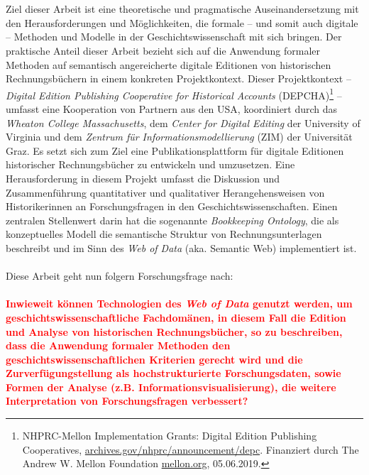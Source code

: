 \documentclass[12pt,a4paper]{article}
\begin{document}
\\
\\
Ziel dieser Arbeit ist eine theoretische und pragmatische Auseinandersetzung mit den Herausforderungen und Möglichkeiten, die formale -- und somit auch digitale -- Methoden und Modelle in der Geschichtswissenschaft mit sich bringen. Der praktische Anteil dieser Arbeit bezieht sich auf die Anwendung formaler Methoden auf semantisch angereicherte digitale Editionen von historischen Rechnungsbüchern in einem konkreten Projektkontext. Dieser Projektkontext -- \textit{Digital Edition Publishing Cooperative for Historical Accounts} (DEPCHA)\footnote{NHPRC-Mellon Implementation Grants: Digital Edition Publishing Cooperatives, \url{archives.gov/nhprc/announcement/depc}. Finanziert durch The Andrew W. Mellon Foundation \url{ mellon.org}, 05.06.2019.} -- umfasst eine Kooperation von Partnern aus den USA, koordiniert durch das \textit{Wheaton College Massachusetts}, dem \textit{Center for Digital Editing} der University of Virginia und dem \textit{Zentrum für Informationsmodellierung} (ZIM) der Universität Graz. Es setzt sich zum Ziel eine Publikationsplattform für digitale Editionen historischer Rechnungsbücher zu entwickeln und umzusetzen. Eine Herausforderung in diesem Projekt umfasst die Diskussion und Zusammenführung quantitativer und qualitativer Herangehensweisen von Historikerinnen an Forschungsfragen in den Geschichtswissenschaften. Einen zentralen Stellenwert darin hat die sogenannte \textit{Bookkeeping Ontology}, die als konzeptuelles Modell die semantische Struktur von Rechnungsunterlagen beschreibt und im Sinn des \textit{Web of Data} (aka. Semantic Web) implementiert ist.
\\
\\
Diese Arbeit geht nun folgern Forschungsfrage nach:
\\
\\
\textcolor{red}{
\textbf{Inwieweit können Technologien des \textit{Web of Data} genutzt werden, um geschichtswissenschaftliche Fachdomänen, in diesem Fall die Edition und Analyse von historischen Rechnungsbücher, so zu beschreiben, dass die Anwendung formaler Methoden den geschichtswissenschaftlichen Kriterien gerecht wird und die Zurverfügungstellung als hochstrukturierte Forschungsdaten, sowie Formen der Analyse (z.B. Informationsvisualisierung), die weitere Interpretation von Forschungsfragen verbessert?} 
}
\end{document}

